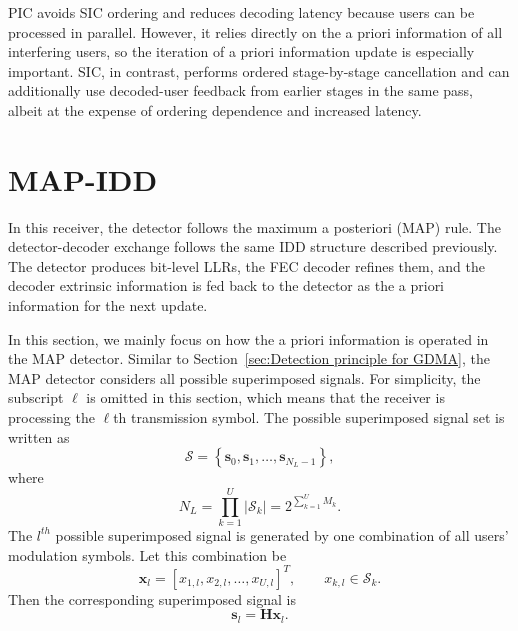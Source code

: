 PIC avoids SIC ordering and reduces decoding latency because users can be processed in parallel. However, it relies directly on the a priori information of all interfering users, so the iteration of a priori information update is especially important. SIC, in contrast, performs ordered stage-by-stage cancellation and can additionally use decoded-user feedback from earlier stages in the same pass, albeit at the expense of ordering dependence and increased latency.

\section{MAP-IDD}

In this receiver, the detector follows the maximum a posteriori (MAP) rule. The detector-decoder exchange follows the same IDD structure described previously. The detector produces bit-level LLRs, the FEC decoder refines them, and the decoder extrinsic information is fed back to the detector as the a priori information for the next update.

In this section, we mainly focus on how the a priori information is operated in the MAP detector. Similar to Section~\ref{sec:Detection principle for GDMA}, the MAP detector considers all possible superimposed signals. For simplicity, the subscript $\ell$ is omitted in this section, which means that the receiver is processing the $\ell$th transmission symbol. The possible superimposed signal set is written as
\begin{equation}
    \mathcal{S}
    =
    \left\{
    \bm{s}_{0},
    \bm{s}_{1},
    \ldots,
    \bm{s}_{N_L-1}
    \right\},
\end{equation}
where
\begin{equation}
    N_L
    =
    \prod_{k=1}^{U}|\mathcal{S}_k|
    =
    2^{\sum_{k=1}^{U}M_k}.
\end{equation}
The $l^{th}$ possible superimposed signal is generated by one combination of all users' modulation symbols. Let this combination be
\begin{equation}
    \bm{x}_{l}
    =
    [x_{1,l},x_{2,l},\ldots,x_{U,l}]^T,
    \qquad
    x_{k,l}\in\mathcal{S}_k .
\end{equation}
Then the corresponding superimposed signal is
\begin{equation}
    \bm{s}_{l}
    =
    \bm{H}\bm{x}_{l}.
\end{equation}

